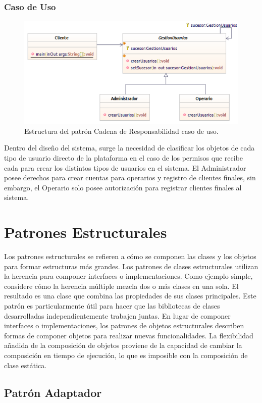 \subsubsection{Caso de Uso}

\begin{figure}[th!]
	\centering
	\includegraphics[width=.7\linewidth]{imagenes/Patrones/Cadena_caso.pdf}
	\caption{Estructura del patrón Cadena de Responsabilidad caso de uso.\cite{gof}}	
\end{figure}

Dentro del diseño del sistema, surge la necesidad de clasificar los objetos de cada tipo de usuario directo de la plataforma en el caso de los permisos que recibe cada para crear los distintos tipos de usuarios en el sistema. El Administrador posee derechos para crear cuentas para operarios y registro de clientes finales, sin embargo, el Operario solo posee autorización para registrar clientes finales al sistema.

\section{Patrones Estructurales}
Los patrones estructurales se refieren a cómo se componen las clases y los objetos para formar estructuras más grandes. Los patrones de clases estructurales utilizan la herencia para componer interfaces o implementaciones. Como ejemplo simple, considere cómo la herencia múltiple mezcla dos o más clases en una sola. El resultado es una clase que combina las propiedades de sus clases principales. Este patrón es particularmente útil para hacer que las bibliotecas de clases desarrolladas independientemente trabajen juntas. En lugar de componer interfaces o implementaciones, los patrones de objetos estructurales describen formas de componer objetos para realizar nuevas funcionalidades. La flexibilidad añadida de la composición de objetos proviene de la capacidad de cambiar la composición en tiempo de ejecución, lo que es imposible con la composición de clase estática.\cite{gof}

\subsection{Patrón Adaptador}

